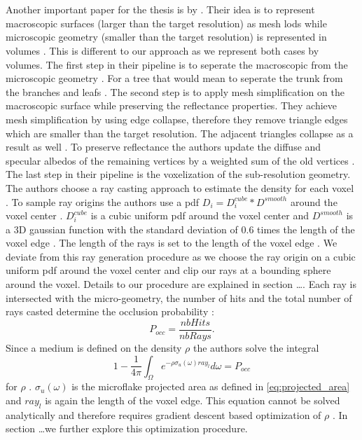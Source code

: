 \section{}
Another important paper for the thesis is  by \citeauthor{hybrid_mesh_volume_lods}.
Their idea is to represent macroscopic surfaces (larger than the target resolution) as mesh \acsp{lod} while microscopic geometry (smaller than the target resolution) is represented in volumes \cite[p. 3]{hybrid_mesh_volume_lods}.
This is different to our approach as we represent both cases by volumes.
The first step in their pipeline is to seperate the macroscopic from the microscopic geometry \cite[p. 5]{hybrid_mesh_volume_lods}.
For a tree that would mean to seperate the trunk from the branches and leafs \cite[p. 3]{hybrid_mesh_volume_lods}.
The second step is to apply mesh simplification on the macroscopic surface while preserving the reflectance properties.
They achieve mesh simplification by using edge collapse, therefore they remove triangle edges which are smaller than the target resolution.
The adjacent triangles collapse as a result as well \cite[p. 6]{hybrid_mesh_volume_lods}.
To preserve reflectance the authors update the diffuse and specular albedos of the remaining vertices by a weighted sum of the old vertices \cite[p. 6]{hybrid_mesh_volume_lods}.
The last step in their pipeline is the voxelization of the sub-resolution geometry.
The authors choose a ray casting approach to estimate the density for each voxel \cite[p. 8]{hybrid_mesh_volume_lods}.
To sample ray origins the authors use a \ac{pdf} $D_i=D_i^{cube} \ast D^{smooth}$ around the voxel center \cite[p. 9]{hybrid_mesh_volume_lods}.
$D_i^{cube}$ is a cubic uniform \ac{pdf} around the voxel center and $D^{smooth}$ is a 3D gaussian function with the standard deviation of 0.6 times the length of the voxel edge \cite[p. 9]{hybrid_mesh_volume_lods}.
The length of the rays is set to the length of the voxel edge \cite[p. 9]{hybrid_mesh_volume_lods}.
We deviate from this ray generation procedure as we choose the ray origin on a cubic uniform \ac{pdf} around the voxel center and clip our rays at a bounding sphere around the voxel.
Details to our procedure are explained in section \dots.
Each ray is intersected with the micro-geometry, the number of hits and the total number of rays casted determine the occlusion probability \cite[p. 8]{hybrid_mesh_volume_lods}:
\begin{equation}
    P_{occ}=\frac{nbHits}{nbRays}.
\end{equation}
Since a medium is defined on the density $\rho$ the authors solve the integral
\begin{equation}
    1 - \frac{1}{4\pi}\int_\Omega e^{-\rho\sigma_u(\omega)ray_l} d\omega = P_{occ}
\end{equation}
for $\rho$ \cite[p. 9]{hybrid_mesh_volume_lods}.
$\sigma_u(\omega)$ is the microflake projected area as defined in \ref{eq:projected_area} and $ray_l$ is again the length of the voxel edge.
This equation cannot be solved analytically and therefore requires gradient descent based optimization of $\rho$ \cite[p. 9]{hybrid_mesh_volume_lods}.
In section \dots we further explore this optimization procedure.

